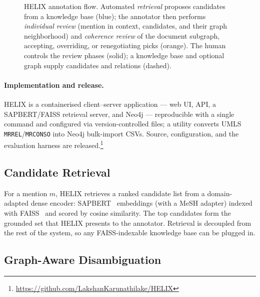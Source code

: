\documentclass[runningheads]{llncs}
\begin{document}
\begin{figure}[t]
{%
}
\caption{HELIX annotation flow. Automated \emph{retrieval} proposes candidates from a
knowledge base (blue); the annotator then performs \emph{individual review} (mention
in context, candidates, and their graph neighborhood) and \emph{coherence review} of
the document subgraph, accepting, overriding, or renegotiating picks (orange). The
human controls the review phases (solid); a knowledge base and optional graph supply
candidates and relations (dashed).}
\label{fig:arch}
\end{figure}

\paragraph{Implementation and release.}
HELIX is a containerised client--server application --- web UI, API, a SAPBERT/FAISS
retrieval server, and Neo4j --- reproducible with a single command and configured via
version-controlled files; a utility converts UMLS \texttt{MRREL}/\texttt{MRCONSO} into
Neo4j bulk-import CSVs. Source, configuration, and the evaluation harness are
released.\footnote{\url{https://github.com/LakshanKarunathilake/HELIX}}

\subsection{Candidate Retrieval}
\label{sec:retrieval}

For a mention $m$, HELIX retrieves a ranked candidate list from a domain-adapted
dense encoder: SAPBERT~\cite{sapbert} embeddings (with a MeSH adapter) indexed
with FAISS~\cite{faiss} and scored by cosine similarity. The top candidates form
the grounded set that HELIX presents to the annotator. Retrieval is decoupled from
the rest of the system, so any FAISS-indexable knowledge base can be plugged in.

\subsection{Graph-Aware Disambiguation}
\label{sec:graph}
\end{document}
